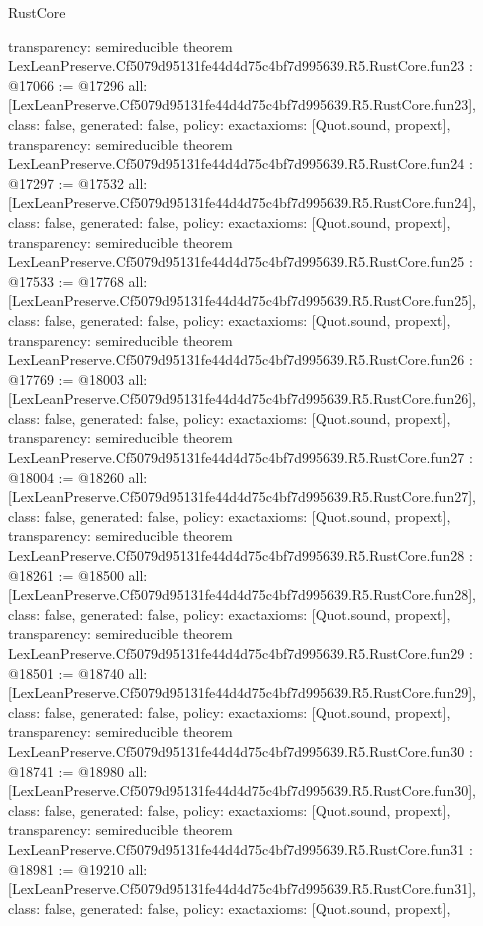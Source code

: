 \begin{lexlean}{RustCore}
\begin{coremodule}
{  transparency: semireducible
}
theorem LexLeanPreserve.Cf5079d95131fe44d4d75c4bf7d995639.R5.RustCore.fun23 : @17066 := @17296 {
  all: [LexLeanPreserve.Cf5079d95131fe44d4d75c4bf7d995639.R5.RustCore.fun23],
  class: false,
  generated: false,
  policy: exact{axioms: [Quot.sound, propext]},
  transparency: semireducible
}
theorem LexLeanPreserve.Cf5079d95131fe44d4d75c4bf7d995639.R5.RustCore.fun24 : @17297 := @17532 {
  all: [LexLeanPreserve.Cf5079d95131fe44d4d75c4bf7d995639.R5.RustCore.fun24],
  class: false,
  generated: false,
  policy: exact{axioms: [Quot.sound, propext]},
  transparency: semireducible
}
theorem LexLeanPreserve.Cf5079d95131fe44d4d75c4bf7d995639.R5.RustCore.fun25 : @17533 := @17768 {
  all: [LexLeanPreserve.Cf5079d95131fe44d4d75c4bf7d995639.R5.RustCore.fun25],
  class: false,
  generated: false,
  policy: exact{axioms: [Quot.sound, propext]},
  transparency: semireducible
}
theorem LexLeanPreserve.Cf5079d95131fe44d4d75c4bf7d995639.R5.RustCore.fun26 : @17769 := @18003 {
  all: [LexLeanPreserve.Cf5079d95131fe44d4d75c4bf7d995639.R5.RustCore.fun26],
  class: false,
  generated: false,
  policy: exact{axioms: [Quot.sound, propext]},
  transparency: semireducible
}
theorem LexLeanPreserve.Cf5079d95131fe44d4d75c4bf7d995639.R5.RustCore.fun27 : @18004 := @18260 {
  all: [LexLeanPreserve.Cf5079d95131fe44d4d75c4bf7d995639.R5.RustCore.fun27],
  class: false,
  generated: false,
  policy: exact{axioms: [Quot.sound, propext]},
  transparency: semireducible
}
theorem LexLeanPreserve.Cf5079d95131fe44d4d75c4bf7d995639.R5.RustCore.fun28 : @18261 := @18500 {
  all: [LexLeanPreserve.Cf5079d95131fe44d4d75c4bf7d995639.R5.RustCore.fun28],
  class: false,
  generated: false,
  policy: exact{axioms: [Quot.sound, propext]},
  transparency: semireducible
}
theorem LexLeanPreserve.Cf5079d95131fe44d4d75c4bf7d995639.R5.RustCore.fun29 : @18501 := @18740 {
  all: [LexLeanPreserve.Cf5079d95131fe44d4d75c4bf7d995639.R5.RustCore.fun29],
  class: false,
  generated: false,
  policy: exact{axioms: [Quot.sound, propext]},
  transparency: semireducible
}
theorem LexLeanPreserve.Cf5079d95131fe44d4d75c4bf7d995639.R5.RustCore.fun30 : @18741 := @18980 {
  all: [LexLeanPreserve.Cf5079d95131fe44d4d75c4bf7d995639.R5.RustCore.fun30],
  class: false,
  generated: false,
  policy: exact{axioms: [Quot.sound, propext]},
  transparency: semireducible
}
theorem LexLeanPreserve.Cf5079d95131fe44d4d75c4bf7d995639.R5.RustCore.fun31 : @18981 := @19210 {
  all: [LexLeanPreserve.Cf5079d95131fe44d4d75c4bf7d995639.R5.RustCore.fun31],
  class: false,
  generated: false,
  policy: exact{axioms: [Quot.sound, propext]},
}
\end{coremodule}
\end{lexlean}
